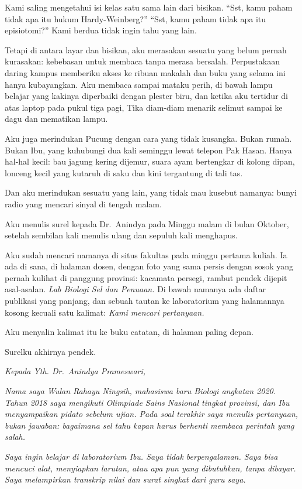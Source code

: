 \documentclass[11pt,twoside,openany]{book}
\makeatletter
\newcommand{\scenebreak}{\par\vspace{0.9em}{\centering\textsc{*\hspace{0.7em}*\hspace{0.7em}*}\par}\vspace{0.9em}\@afterindentfalse\@afterheading}
\makeatother
\begin{document}
Kami saling mengetahui isi kelas satu sama lain dari bisikan. ``Sst, kamu paham tidak apa itu hukum Hardy-Weinberg?'' ``Sst, kamu paham tidak apa itu episiotomi?'' Kami berdua tidak ingin tahu yang lain.

Tetapi di antara layar dan bisikan, aku merasakan sesuatu yang belum pernah kurasakan: kebebasan untuk membaca tanpa merasa bersalah. Perpustakaan daring kampus memberiku akses ke ribuan makalah dan buku yang selama ini hanya kubayangkan. Aku membaca sampai mataku perih, di bawah lampu belajar yang kakinya diperbaiki dengan plester biru, dan ketika aku tertidur di atas laptop pada pukul tiga pagi, Tika diam-diam menarik selimut sampai ke dagu dan mematikan lampu.

Aku juga merindukan Pucung dengan cara yang tidak kusangka. Bukan rumah. Bukan Ibu, yang kuhubungi dua kali seminggu lewat telepon Pak Hasan. Hanya hal-hal kecil: bau jagung kering dijemur, suara ayam bertengkar di kolong dipan, lonceng kecil yang kutaruh di saku dan kini tergantung di tali tas.

Dan aku merindukan sesuatu yang lain, yang tidak mau kusebut namanya: bunyi radio yang mencari sinyal di tengah malam.

\scenebreak
Aku menulis surel kepada Dr.~Anindya pada Minggu malam di bulan Oktober, setelah sembilan kali menulis ulang dan sepuluh kali menghapus.

Aku sudah mencari namanya di situs fakultas pada minggu pertama kuliah. Ia ada di sana, di halaman dosen, dengan foto yang sama persis dengan sosok yang pernah kulihat di panggung provinsi: kacamata persegi, rambut pendek dijepit asal-asalan. \emph{Lab Biologi Sel dan Penuaan.} Di bawah namanya ada daftar publikasi yang panjang, dan sebuah tautan ke laboratorium yang halamannya kosong kecuali satu kalimat: \emph{Kami mencari pertanyaan.}

Aku menyalin kalimat itu ke buku catatan, di halaman paling depan.

Surelku akhirnya pendek.

\emph{Kepada Yth. Dr.~Anindya Prameswari,}

\emph{Nama saya Wulan Rahayu Ningsih, mahasiswa baru Biologi angkatan 2020. Tahun 2018 saya mengikuti Olimpiade Sains Nasional tingkat provinsi, dan Ibu menyampaikan pidato sebelum ujian. Pada soal terakhir saya menulis pertanyaan, bukan jawaban: bagaimana sel tahu kapan harus berhenti membaca perintah yang salah.}

\emph{Saya ingin belajar di laboratorium Ibu. Saya tidak berpengalaman. Saya bisa mencuci alat, menyiapkan larutan, atau apa pun yang dibutuhkan, tanpa dibayar. Saya melampirkan transkrip nilai dan surat singkat dari guru saya.}
\end{document}
